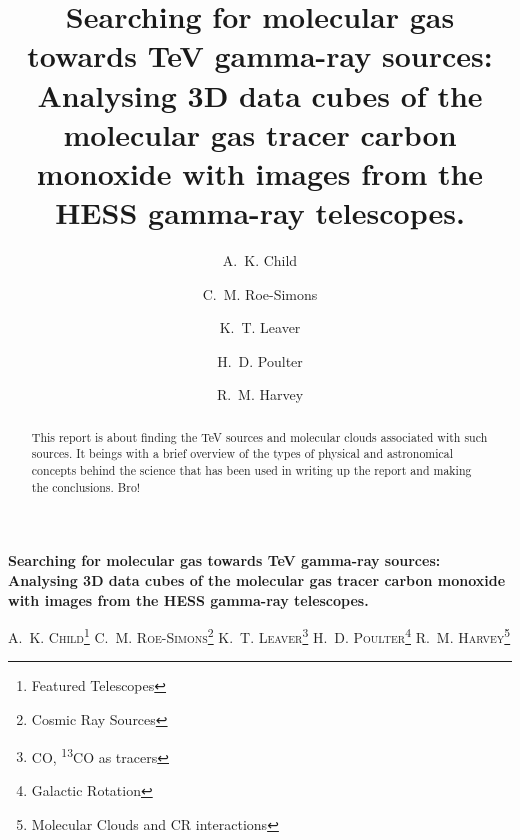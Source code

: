 \documentclass[a4paper, titlepage, oneside]{article}
\newcommand{\elem}[2]{\textsuperscript{#1}{#2}}
\begin{document}
\title{\textbf{Searching for molecular gas towards TeV gamma-ray sources: Analysing 3D data cubes of the molecular gas tracer carbon monoxide with images from the HESS gamma-ray telescopes.}}
\author{A.~K. Child \and C.~M. Roe-Simons \and K.~T. Leaver \and H.~D. Poulter \and R.~M. Harvey}
\date{} %
\maketitle

\setcounter{page}{1}

\tableofcontents

\clearpage
\setcounter{page}{1}

\begin{center}
{\LARGE \textbf{Searching for molecular gas towards TeV gamma-ray sources: Analysing 3D data cubes of the molecular gas tracer carbon monoxide with images from the HESS gamma-ray telescopes.}}

\vspace{1.5em}

\textsc{A.~K. Child\footnote{Featured Telescopes} \quad C.~M. Roe-Simons\footnote{Cosmic Ray Sources} \quad K.~T. Leaver\footnote{CO, \elem{13}{CO} as tracers} \quad H.~D. Poulter\footnote{Galactic Rotation} \quad R.~M. Harvey\footnote{Molecular Clouds and CR interactions}}
\end{center}

\vspace{2em}

\begin{minipage}{0.93\textwidth}
\begin{abstract}
This report is about finding the TeV sources and molecular clouds associated with such sources. It beings with a brief overview of the types of physical and astronomical concepts behind the science that has been used in writing up the report and making the conclusions. Bro!
\end{abstract}
\end{minipage}

\vspace{2.5em}
\end{document}
